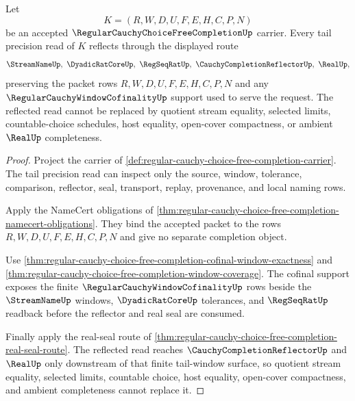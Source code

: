 \begin{theorem}
\label{thm:regular-cauchy-choice-free-completion-tail-reflection}
Let
$$
K=(R,W,D,U,F,E,H,C,P,N)
$$
be an accepted $\RegularCauchyChoiceFreeCompletionUp$ carrier. Every tail precision read of $K$ reflects through the displayed route
$$
\StreamNameUp,\ \DyadicRatCoreUp,\ \RegSeqRatUp,\ \CauchyCompletionReflectorUp,\ \RealUp,
$$
preserving the packet rows $R,W,D,U,F,E,H,C,P,N$ and any $\RegularCauchyWindowCofinalityUp$ support used to serve the request. The reflected read cannot be replaced by quotient stream equality, selected limits, countable-choice schedules, host equality, open-cover compactness, or ambient $\RealUp$ completeness.
\end{theorem}
\begin{proof}
Project the carrier of \autoref{def:regular-cauchy-choice-free-completion-carrier}. The tail precision read can inspect only the source, window, tolerance, comparison, reflector, seal, transport, replay, provenance, and local naming rows.

Apply the NameCert obligations of \autoref{thm:regular-cauchy-choice-free-completion-namecert-obligations}. They bind the accepted packet to the rows $R,W,D,U,F,E,H,C,P,N$ and give no separate completion object.

Use \autoref{thm:regular-cauchy-choice-free-completion-cofinal-window-exactness} and \autoref{thm:regular-cauchy-choice-free-completion-window-coverage}. The cofinal support exposes the finite $\RegularCauchyWindowCofinalityUp$ rows beside the $\StreamNameUp$ windows, $\DyadicRatCoreUp$ tolerances, and $\RegSeqRatUp$ readback before the reflector and real seal are consumed.

Finally apply the real-seal route of \autoref{thm:regular-cauchy-choice-free-completion-real-seal-route}. The reflected read reaches $\CauchyCompletionReflectorUp$ and $\RealUp$ only downstream of that finite tail-window surface, so quotient stream equality, selected limits, countable choice, host equality, open-cover compactness, and ambient completeness cannot replace it.
\end{proof}

